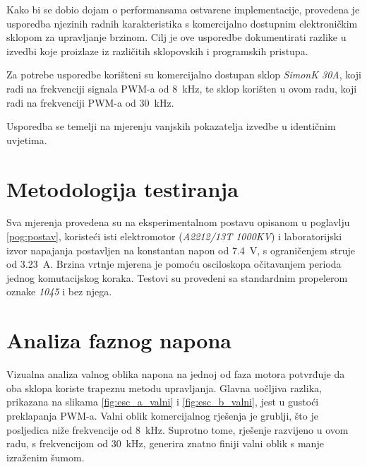 \documentclass[diplomskirad]{fer}
\begin{document}
Kako bi se dobio dojam o performansama ostvarene implementacije, provedena je
usporedba njezinih radnih karakteristika s komercijalno dostupnim elektroničkim
sklopom za upravljanje brzinom. Cilj je ove usporedbe dokumentirati razlike u
izvedbi koje proizlaze iz različitih sklopovskih i programskih pristupa.

Za potrebe usporedbe korišteni su komercijalno dostupan sklop
\textit{SimonK 30A}, koji radi na frekvenciji signala PWM-a od
\SI{8}{\kilo\hertz}, te sklop korišten u ovom radu, koji radi na frekvenciji
PWM-a od \SI{30}{\kilo\hertz}.

Usporedba se temelji na mjerenju vanjskih pokazatelja izvedbe u identičnim
uvjetima.

\section{Metodologija testiranja}
\label{sec:metodologija_testiranja}

Sva mjerenja provedena su na eksperimentalnom postavu opisanom u poglavlju
\ref{pog:postav}, koristeći isti elektromotor (\textit{A2212/13T 1000KV}) i
laboratorijski izvor napajanja postavljen na konstantan napon od
\SI{7.4}{\volt}, s ograničenjem struje od \SI{3.23}{\ampere}. Brzina vrtnje
mjerena je pomoću osciloskopa očitavanjem perioda jednog komutacijskog koraka.
Testovi su provedeni sa standardnim propelerom oznake \textit{1045} i bez
njega.

\section{Analiza faznog napona}
\label{sec:analiza_napona}

Vizualna analiza valnog oblika napona na jednoj od faza motora potvrđuje da oba
sklopa koriste trapeznu metodu upravljanja. Glavna uočljiva razlika, prikazana
na slikama \ref{fig:esc_a_valni} i \ref{fig:esc_b_valni}, jest u gustoći
preklapanja PWM-a. Valni oblik komercijalnog rješenja je grublji, što je
posljedica niže frekvencije od \SI{8}{\kilo\hertz}. Suprotno tome, rješenje
razvijeno u ovom radu, s frekvencijom od \SI{30}{\kilo\hertz}, generira znatno
finiji valni oblik s manje izraženim šumom.

\label{fig:esc_a_valni}

\label{fig:esc_b_valni}
\end{document}
